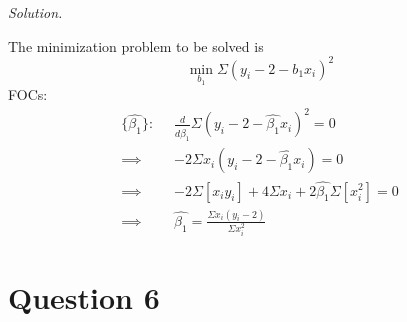 \documentclass[
]{article}
\begin{document}
\textit{Solution.}

The minimization problem to be solved is
\[\min _ {b_1} \Sigma(y_i-2-b_1 x_i)^2\] FOCs: \[\begin{aligned}
\{\hat{\beta_1}\}: \; \; &\frac{d}{d\hat{\beta_1}} \Sigma(y_i-2-\hat{\beta_1} x_i)^2 = 0\\
\implies& -2\Sigma x_i(y_i-2-\hat{\beta_1} x_i) = 0  \\
\implies& -2 \Sigma [x_iy_i] + 4 \Sigma x_i+ 2 \hat{\beta_1} \Sigma [x_i^2] = 0 \\
\implies& \hat{\beta_1} = \frac{\Sigma x_i(y_i-2)}{\Sigma x_i^2}
\end{aligned}\]

\hypertarget{question-6}{%
\section{Question 6}\label{question-6}}
\end{document}
